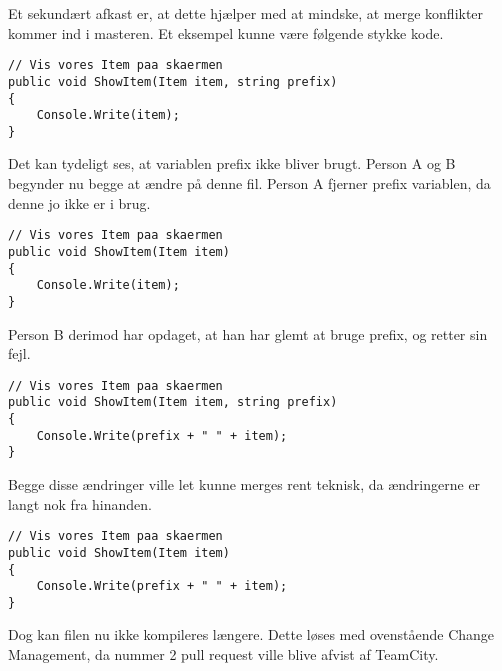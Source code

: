 Et sekundært afkast er, at dette hjælper med at mindske, at merge konflikter kommer ind i masteren. Et eksempel kunne være følgende stykke kode.
\begin{lstlisting}
// Vis vores Item paa skaermen
public void ShowItem(Item item, string prefix)
{
    Console.Write(item);
}
\end{lstlisting}
Det kan tydeligt ses, at variablen prefix ikke bliver brugt. Person A og B begynder nu begge at ændre på denne fil. Person A fjerner prefix variablen, da denne jo ikke er i brug.
\begin{lstlisting}
// Vis vores Item paa skaermen
public void ShowItem(Item item)
{
    Console.Write(item);
}
\end{lstlisting}
Person B derimod har opdaget, at han har glemt at bruge prefix, og retter sin fejl.
\begin{lstlisting}
// Vis vores Item paa skaermen
public void ShowItem(Item item, string prefix)
{
    Console.Write(prefix + " " + item);
}
\end{lstlisting}
Begge disse ændringer ville let kunne merges rent teknisk, da ændringerne er langt nok fra hinanden.
\begin{lstlisting}
// Vis vores Item paa skaermen
public void ShowItem(Item item)
{
    Console.Write(prefix + " " + item);
}
\end{lstlisting}
Dog kan filen nu ikke kompileres længere. Dette løses med ovenstående Change Management, da nummer 2 pull request ville blive afvist af TeamCity. 
